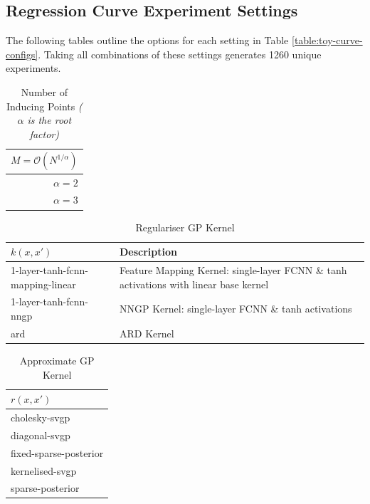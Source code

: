 \documentclass{article}
\numberwithin{equation}{section}
\begin{document}
\subsection{Regression Curve Experiment Settings}\label{appendix:configurations}
The following tables outline the options for each setting in Table \ref{table:toy-curve-configs}. 
Taking all combinations of these settings generates 1260 unique experiments.

\begin{table}[h!]
\tiny
\centering
\begin{tabular}{r}
\toprule
 $M = \mathcal{O}\left(N^{1/\alpha}\right)$ \\
\midrule
                                 $\alpha=2$ \\
                                 $\alpha=3$ \\
\bottomrule
\end{tabular}
\caption{Number of Inducing Points \textit{($\alpha$ is the root factor)}}
\end{table}

\begin{table}[h!]
\tiny
\centering
\begin{tabular}{ll}
\toprule
             $k(x, x')$ & Description\\
\midrule
1-layer-tanh-fcnn-mapping-linear & Feature Mapping Kernel: single-layer FCNN \& tanh activations with linear base kernel\\
          1-layer-tanh-fcnn-nngp &  NNGP Kernel: single-layer FCNN \& tanh activations\\
                            ard & ARD Kernel\\
\bottomrule
\end{tabular}
\caption{Regulariser GP Kernel}
\end{table}

\begin{table}[h!]
\tiny
\centering
\begin{tabular}{l}
\toprule
    $r(x, x')$ \\
\midrule
         cholesky-svgp \\
         diagonal-svgp \\
fixed-sparse-posterior \\
       kernelised-svgp \\
      sparse-posterior \\
\bottomrule
\end{tabular}
\caption{Approximate GP Kernel}
\end{table}
\end{document}
